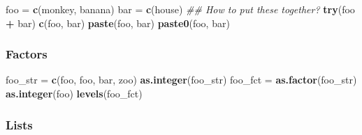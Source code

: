 \documentclass[
]{article}
\newenvironment{Shaded}{\begin{snugshade}}{\end{snugshade}}
\newcommand{\CommentTok}[1]{\textcolor[rgb]{0.56,0.35,0.01}{\textit{#1}}}
\newcommand{\KeywordTok}[1]{\textcolor[rgb]{0.13,0.29,0.53}{\textbf{#1}}}
\newcommand{\NormalTok}[1]{#1}
\newcommand{\OperatorTok}[1]{\textcolor[rgb]{0.81,0.36,0.00}{\textbf{#1}}}
\newcommand{\StringTok}[1]{\textcolor[rgb]{0.31,0.60,0.02}{#1}}
\begin{document}
\begin{Shaded}
\begin{Highlighting}[]
\NormalTok{foo =}\StringTok{ }\KeywordTok{c}\NormalTok{(}\StringTok{\textquotesingle{}monkey\textquotesingle{}}\NormalTok{, }\StringTok{\textquotesingle{}banana\textquotesingle{}}\NormalTok{)}
\NormalTok{bar =}\StringTok{ }\KeywordTok{c}\NormalTok{(}\StringTok{\textquotesingle{}house\textquotesingle{}}\NormalTok{)}
\CommentTok{\#\# How to put these together? }
\KeywordTok{try}\NormalTok{(foo }\OperatorTok{+}\StringTok{ }\NormalTok{bar)}
\KeywordTok{c}\NormalTok{(foo, bar)}
\KeywordTok{paste}\NormalTok{(foo, bar)}
\KeywordTok{paste0}\NormalTok{(foo, bar)}
\end{Highlighting}
\end{Shaded}

\hypertarget{factors}{%
\subsubsection{Factors}\label{factors}}

\begin{Shaded}
\begin{Highlighting}[]
\NormalTok{foo\_str =}\StringTok{ }\KeywordTok{c}\NormalTok{(}\StringTok{\textquotesingle{}foo\textquotesingle{}}\NormalTok{, }\StringTok{\textquotesingle{}foo\textquotesingle{}}\NormalTok{, }\StringTok{\textquotesingle{}bar\textquotesingle{}}\NormalTok{, }\StringTok{\textquotesingle{}zoo\textquotesingle{}}\NormalTok{)}
\KeywordTok{as.integer}\NormalTok{(foo\_str)}
\NormalTok{foo\_fct =}\StringTok{ }\KeywordTok{as.factor}\NormalTok{(foo\_str)}
\KeywordTok{as.integer}\NormalTok{(foo)}
\KeywordTok{levels}\NormalTok{(foo\_fct)}
\end{Highlighting}
\end{Shaded}

\hypertarget{lists}{%
\subsubsection{Lists}\label{lists}}
\end{document}
